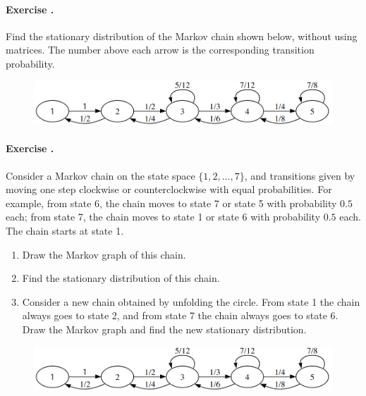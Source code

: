\documentclass[12pt,a4paper]{article}
\newcounter{num}  %
\begin{document}
	
	\paragraph{Exercise \thenum.} %
		Find the stationary distribution of the Markov chain shown below, without using matrices. 
		The number above each arrow is the corresponding transition probability.
		\begin{figure}[h!]
			\begin{center}
				\includegraphics[width = .6\textwidth]{images/markov_rev.png}
			\end{center}
		\end{figure}
	
	
	
	\paragraph{Exercise \thenum.}%
	Consider a Markov chain on the state space $\{1, 2,\ldots, 7\}$, and transitions given by moving one step clockwise or counterclockwise with equal probabilities. For example, from state 6, the chain moves
	to state 7 or state 5 with probability $0.5$ each; from state 7, the chain moves to state 1
	or state 6 with probability $0.5$ each. 
	The chain starts at state 1.
	\begin{enumerate}
		\item Draw the Markov graph of this chain.
		\item Find the stationary distribution of this chain.
		\item Consider a new chain obtained by unfolding the circle. 
		From state 1 the chain always goes to state 2, and from state 7 the	chain always goes to state 6. 
		Draw the Markov graph and find the new stationary distribution.
	\end{enumerate}
		\begin{figure}[h!]
			\begin{center}
				\includegraphics[width = .6\textwidth]{images/markov_rev.png}
			\end{center}
		\end{figure}
	
\end{document}
